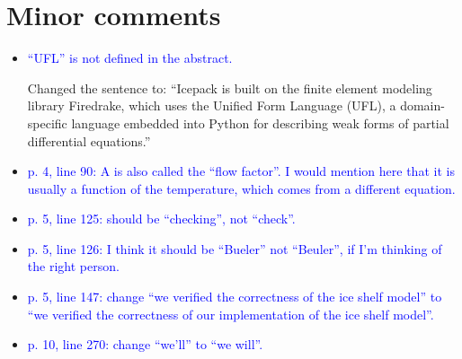 \documentclass{article}
\theoremstyle{definition}
\theoremstyle{plain}
\begin{document}
\section*{Minor comments}

\begin{itemize}
\item \textcolor{blue}{“UFL” is not defined in the abstract.}

Changed the sentence to: ``Icepack is built on the finite element modeling library Firedrake, which uses the Unified Form Language (UFL), a domain-specific language embedded into Python for describing weak forms of partial differential equations.''

\item \textcolor{blue}{p. 4, line 90: A is also called the “flow factor”. I would mention here that it is usually a function of
the temperature, which comes from a different equation.}
\item \textcolor{blue}{p. 5, line 125: should be “checking”, not “check”.} \checkmark
\item \textcolor{blue}{p. 5, line 126: I think it should be “Bueler” not “Beuler”, if I’m thinking of the right person.} \checkmark
\item \textcolor{blue}{p. 5, line 147: change “we verified the correctness of the ice shelf model” to “we verified the correctness
of our implementation of the ice shelf model”.} \checkmark
\item \textcolor{blue}{p. 10, line 270: change “we’ll” to “we will”.} \checkmark
\end{itemize}
\end{document}
